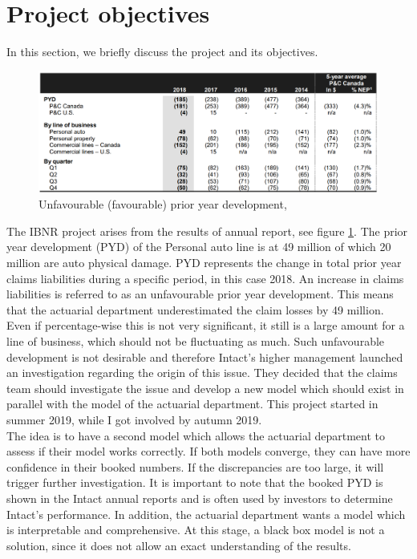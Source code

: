 \section{Project objectives}\label{sect_objective}
In this section, we briefly discuss the project and its objectives.
\begin{figure}[H]
	\begin{center}
		\includegraphics[scale=0.4]{Graphiques/PYD} 
		\renewcommand{\figurename}{Figure}
		\caption{Unfavourable (favourable) prior year development, \cite{intact2018}}\label{Ill_annual_report}
	\end{center}
\end{figure}
The IBNR project arises from the results of \cite{intact2018} annual report, see figure \ref{Ill_annual_report}. The prior year development (PYD) of the Personal auto line is at 49 million of which 20 million are auto physical damage. PYD represents the change in total prior year claims liabilities during a specific period, in this case 2018. An increase in claims liabilities is referred to as an unfavourable prior year development. This means that the actuarial department underestimated the claim losses by 49 million. Even if percentage-wise this is not very significant, it still is a large amount for a line of business, which should not be fluctuating as much. Such unfavourable development is not desirable and therefore Intact's higher management launched an investigation regarding the origin of this issue. They decided that the claims team should investigate the issue and develop a new model which should exist in parallel with the model of the actuarial department. This project started in summer 2019, while I got involved by autumn 2019. \\ 
The idea is to have a second model which allows the actuarial department to assess if their model works correctly. If both models converge, they can have more confidence in their booked numbers. If the discrepancies are too large, it will trigger further investigation. It is important to note that the booked PYD is shown in the Intact annual reports and is often used by investors to determine Intact's performance. In addition, the actuarial department wants a model which is interpretable and comprehensive. At this stage, a black box model is not a solution, since it does not allow an exact understanding of the results.\\
